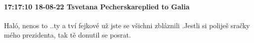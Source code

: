  
 
 
 
 

\paragraph{17:17:10 18-08-22 Tsvetana Pecherskareplied to Galia}

Haló, nenos to ..ty a tví fejkové už jste se všichni zbláznili .Jestli si
poliješ sračky mého prezidenta, tak tě donutil se posrat.

